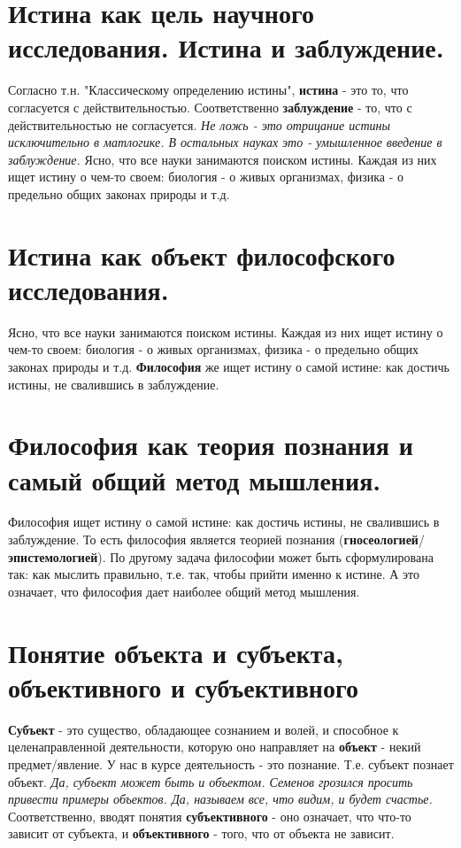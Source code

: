\documentclass[12pt,a4paper]{article}
\begin{document}
\section{Истина как цель научного исследования. Истина и заблуждение.}
Согласно т.н. "Классическому определению истины", \textbf{истина} - это то, что согласуется с действительностью. 
Соответственно \textbf{заблуждение} - то, что с действительностью не согласуется. \textit{Не ложь - это отрицание истины исключительно в матлогике. В остальных науках это - умышленное введение в заблуждение.}
Ясно, что все науки занимаются поиском истины.
Каждая из них ищет истину о чем-то своем: биология - о живых организмах, физика - о предельно общих законах природы и т.д.

\section{Истина как объект философского исследования.}
Ясно, что все науки занимаются поиском истины.
Каждая из них ищет истину о чем-то своем: биология - о живых организмах, физика - о предельно общих законах природы и т.д.
\textbf{Философия} же ищет истину о самой истине: как достичь истины, не свалившись в заблуждение.

\section{Философия как теория познания и самый общий метод мышления.}
Философия ищет истину о самой истине: как достичь истины, не свалившись в заблуждение.
То есть философия является теорией познания (\textbf{гносеологией}/\textbf{эпистемологией}).
По другому задача философии может быть сформулирована так: как мыслить правильно, т.е. так, чтобы прийти именно к истине.
А это означает, что философия дает наиболее общий метод мышления. 

\section{Понятие объекта и субъекта, объективного и субъективного}
\textbf{Субъект} - это существо, обладающее сознанием и волей, и способное к целенаправленной деятельности,
которую оно направляет на \textbf{объект} - некий предмет/явление.
У нас в курсе деятельность - это познание.
Т.е. субъект познает объект.
\textit{Да, субъект может быть и объектом. Семенов грозился просить привести примеры объектов.
Да, называем все, что видим, и будет счастье.} 
Соответственно, вводят понятия \textbf{субъективного} - оно означает, что что-то зависит от субъекта,
и \textbf{объективного} - того, что от объекта не зависит.
\end{document}
